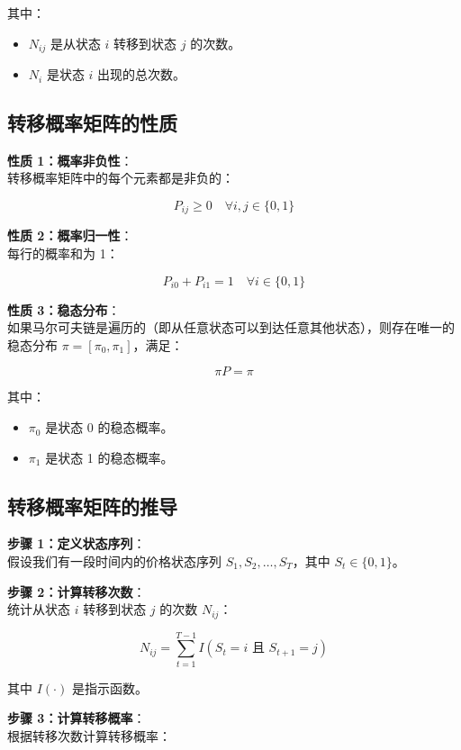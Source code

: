 \documentclass[a4paper]{article}
\begin{document}
其中：
\begin{itemize}
    \item \( N_{ij} \) 是从状态 \( i \) 转移到状态 \( j \) 的次数。
    \item \( N_i \) 是状态 \( i \) 出现的总次数。
\end{itemize}

\subsection*{ 转移概率矩阵的性质}

\noindent \textbf{性质 1：概率非负性}： \\
转移概率矩阵中的每个元素都是非负的：

\[
P_{ij} \geq 0 \quad \forall i, j \in \{0, 1\}
\]

\noindent \textbf{性质 2：概率归一性}： \\
每行的概率和为 1：

\[
P_{i0} + P_{i1} = 1 \quad \forall i \in \{0, 1\}
\]

\noindent \textbf{性质 3：稳态分布}： \\
如果马尔可夫链是遍历的（即从任意状态可以到达任意其他状态），则存在唯一的稳态分布 \( \pi = [\pi_0, \pi_1] \)，满足：

\[
\pi P = \pi
\]

其中：
\begin{itemize}
    \item \( \pi_0 \) 是状态 0 的稳态概率。
    \item \( \pi_1 \) 是状态 1 的稳态概率。
\end{itemize}

\subsection*{转移概率矩阵的推导}

\noindent \textbf{步骤 1：定义状态序列}： \\
假设我们有一段时间内的价格状态序列 \( S_1, S_2, \dots, S_T \)，其中 \( S_t \in \{0, 1\} \)。

\noindent \textbf{步骤 2：计算转移次数}： \\
统计从状态 \( i \) 转移到状态 \( j \) 的次数 \( N_{ij} \)：

\[
N_{ij} = \sum_{t=1}^{T-1} I(S_t = i \text{ 且 } S_{t+1} = j)
\]

其中 \( I(\cdot) \) 是指示函数。

\noindent \textbf{步骤 3：计算转移概率}： \\
根据转移次数计算转移概率：
\end{document}

